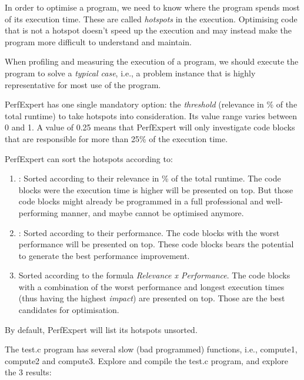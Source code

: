 In order to optimise a program, we need to know where the program spends most of its execution time. These are called \emph{hotspots} in the execution. Optimising code that is not a hotspot doesn't speed up the execution and may instead make the program more difficult to understand and maintain.

When profiling and measuring the execution of a program, we should execute the program to solve a \emph{typical case}, i.e., a problem instance that is highly representative for most use of the program.

PerfExpert has one single mandatory option: the \emph{threshold} (relevance in \% of the total runtime) to take hotspots into consideration. Its value range varies between 0 and 1. A value of 0.25 means that PerfExpert will only investigate code blocks that are responsible for more than 25\% of the execution time.

PerfExpert can sort the hotspots according to:

\begin{enumerate}
  \item  {}: Sorted according to their relevance in \% of the total runtime. The code blocks were the execution time is higher will be presented on top. But those code blocks might already be programmed in a full professional and well-performing manner, and maybe cannot be optimised anymore.
  \item  {}: Sorted according to their performance. The code blocks with the worst performance will be presented on top. These code blocks bears the potential to generate the best performance improvement.
  \item  {} Sorted according to the formula \emph{Relevance x Performance}. The code blocks with a combination of the worst performance and longest execution times (thus having the highest \emph{impact}) are presented on top. Those are the best candidates for optimisation.
\end{enumerate}

By default, PerfExpert will list its hotspots unsorted.

The test.c program has several slow (bad programmed) functions, i.e., compute1, compute2 and compute3. Explore and compile the test.c program, and explore the 3 results:

\begin{prompt}
\end{prompt}

